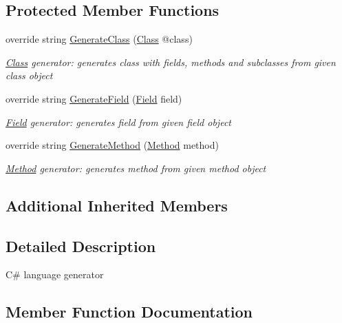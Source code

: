 \subsection*{Protected Member Functions}
\begin{DoxyCompactItemize}
\item 
override string \mbox{\hyperlink{classCodeGen_1_1generators_1_1CSharpGenerator_ae09fc218c8ddef8f13649ed278e93ff1}{Generate\+Class}} (\mbox{\hyperlink{classCodeGen_1_1generators_1_1Class}{Class}} @class)
\begin{DoxyCompactList}\small\item\em \mbox{\hyperlink{classCodeGen_1_1generators_1_1Class}{Class}} generator\+: generates class with fields, methods and subclasses from given class object  \end{DoxyCompactList}\item 
override string \mbox{\hyperlink{classCodeGen_1_1generators_1_1CSharpGenerator_a72ff9ea0d6e5119e5a720eb54a952201}{Generate\+Field}} (\mbox{\hyperlink{classCodeGen_1_1generators_1_1Field}{Field}} field)
\begin{DoxyCompactList}\small\item\em \mbox{\hyperlink{classCodeGen_1_1generators_1_1Field}{Field}} generator\+: generates field from given field object  \end{DoxyCompactList}\item 
override string \mbox{\hyperlink{classCodeGen_1_1generators_1_1CSharpGenerator_af39766dfe9c70d55091f7b8812bf8399}{Generate\+Method}} (\mbox{\hyperlink{classCodeGen_1_1generators_1_1Method}{Method}} method)
\begin{DoxyCompactList}\small\item\em \mbox{\hyperlink{classCodeGen_1_1generators_1_1Method}{Method}} generator\+: generates method from given method object  \end{DoxyCompactList}\end{DoxyCompactItemize}
\subsection*{Additional Inherited Members}


\subsection{Detailed Description}
C\# language generator 



\subsection{Member Function Documentation}
\mbox{\label{classCodeGen_1_1generators_1_1CSharpGenerator_ae09fc218c8ddef8f13649ed278e93ff1}} 
